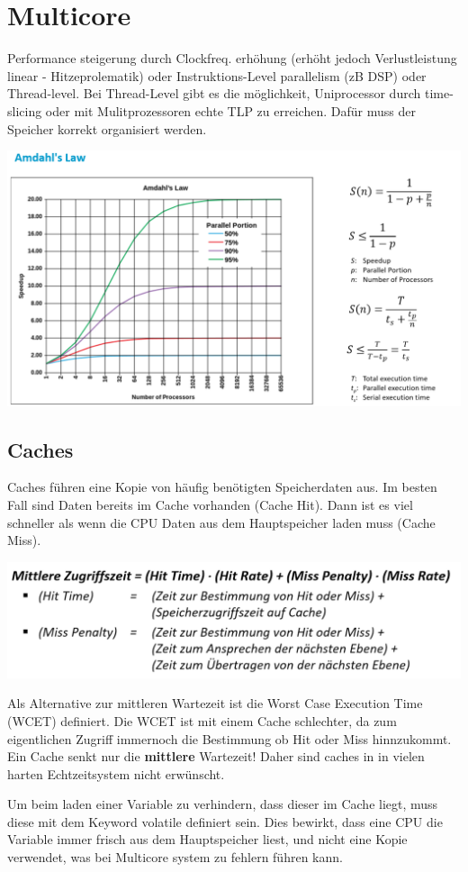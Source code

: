 \section{Multicore}
Performance steigerung durch Clockfreq. erhöhung (erhöht jedoch Verlustleistung linear - Hitzeprolematik) oder Instruktions-Level parallelism (zB DSP) oder Thread-level. Bei Thread-Level gibt es die möglichkeit, Uniprocessor durch time-slicing oder mit Mulitprozessoren  echte TLP zu erreichen. Dafür muss der Speicher korrekt organisiert werden.

\begin{center}
	\includegraphics[width=\columnwidth]{Images/amdahls}
\end{center}

\subsection{Caches}
Caches führen eine Kopie von häufig benötigten Speicherdaten aus. Im besten Fall sind Daten bereits im Cache vorhanden (Cache Hit). Dann ist es viel schneller als wenn die CPU Daten aus dem Hauptspeicher laden muss (Cache Miss). 
\begin{center}
	\includegraphics[width=\columnwidth]{Images/mittlerewartezeit}
\end{center}

Als Alternative zur mittleren Wartezeit ist die Worst Case Execution Time (WCET) definiert. Die WCET ist mit einem Cache schlechter, da zum eigentlichen Zugriff immernoch die Bestimmung ob Hit oder Miss hinnzukommt. Ein Cache senkt nur die \textbf{mittlere} Wartezeit! Daher sind caches in in vielen harten Echtzeitsystem nicht erwünscht.

Um beim laden einer Variable zu verhindern, dass dieser im Cache liegt, muss diese mit dem Keyword volatile definiert sein. Dies bewirkt, dass eine CPU die Variable immer frisch aus dem Hauptspeicher liest, und nicht eine Kopie verwendet, was bei Multicore system zu fehlern führen kann.